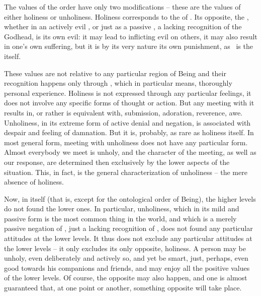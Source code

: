 \pa\inv The values of the  order have only two
modifications -- these are the  values of either holiness or unholiness.
 Holiness corresponds to the  of \yes. Its opposite, the \No, whether in an actively evil 
, or just as a passive \No, a lacking recognition of the 
Godhead, is its own evil: it may lead to inflicting evil on others, it may also
result in one's own suffering, but it is by its very nature its own punishment,
as \No\ is the  itself.

These values are not relative to any particular region of Being and
their recognition happens only through , which in
particular means, thoroughly personal experience.  Holiness is not
expressed through any particular feelings, it does not involve any 
specific forms of thought or action. But any meeting with it results
in, or rather is equivalent with, submission, adoration, reverence, awe.
Unholiness, in its extreme
form of active denial and negation, is associated with despair and feeling of
damnation.  But it is, probably, as rare as holiness itself.  In most 
general form, meeting
with unholiness does not have any particular form. 
Almost everybody we meet is unholy, and the character of the meeting,
as well as our response, are determined then exclusively by the lower
aspects of the situation. This, in fact, is the general 
characterization of unholiness -- the mere absence of holiness.


\pa\label{pa:unholygood}
Now, in itself (that is, except for the ontological order of
Being), the higher levels do not found the lower ones.  In particular,
unholiness, which in its mild and passive form is the most common
thing in the world, and which is a merely passive negation of \No, just a
lacking recognition of \yes, does not found any particular attitudes
at the lower levels. It thus does not exclude any particular 
attitudes at the lower levels -- it only excludes its only opposite, 
holiness. A person may be unholy, even deliberately and actively so, 
and yet be smart, just, perhaps, even good towards his companions and 
friends, and may enjoy all the positive values of the lower levels. Of 
course, the opposite may also happen, and one is almost guaranteed 
that, at one point or another, something opposite will take place.

